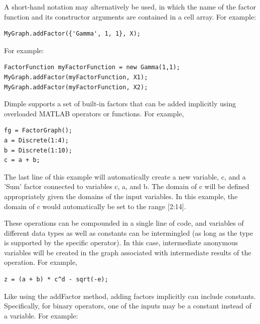 A short-hand notation may alternatively be used, in which the name of the factor function and its constructor arguments are contained in a cell array.  For example:

\begin{lstlisting}
MyGraph.addFactor({'Gamma', 1, 1}, X);
\end{lstlisting}

\fi

\ifjava

For example:

\begin{lstlisting}
FactorFunction myFactorFunction = new Gamma(1,1);
MyGraph.addFactor(myFactorFunction, X1);
MyGraph.addFactor(myFactorFunction, X2);
\end{lstlisting}


\fi

\ifmatlab

\label{sec:ImplicitFactorCreation}

Dimple supports a set of built-in factors that can be added implicitly using overloaded MATLAB operators or functions.  For example,

\begin{lstlisting}
fg = FactorGraph();
a = Discrete(1:4);
b = Discrete(1:10);
c = a + b;
\end{lstlisting}

The last line of this example will automatically create a new variable, c, and a 'Sum' factor connected to variables c, a, and b.  The domain of c will be defined appropriately given the domains of the input variables.  In this example, the domain of c would automatically be set to the range [2:14].

These operations can be compounded in a single line of code, and variables of different data types as well as constants can be intermingled (as long as the type is supported by the specific operator).  In this case, intermediate anonymous variables will be created in the graph associated with intermediate results of the operation.  For example,

\begin{lstlisting}
z = (a + b) * c^d - sqrt(-e);
\end{lstlisting}

Like using the addFactor method, adding factors implicitly can include constants.  Specifically, for binary operators, one of the inputs may be a constant instead of a variable.  For example:

